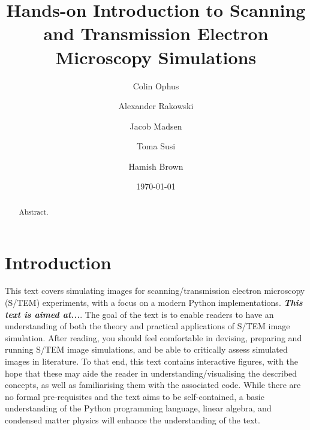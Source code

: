 \documentclass[%
 superscriptaddress,
 aip,
 amsmath,amssymb,
preprint,%
 author-year,%
longbibliography
]{revtex4-2}
\begin{document}
\title[Elements: S/TEM Sim]{Hands-on Introduction to Scanning and Transmission Electron Microscopy Simulations}

\author{Colin Ophus}

\author{Alexander Rakowski}

\author{Jacob Madsen}

\author{Toma Susi}

\author{Hamish Brown}


\date{\today}
\begin{abstract}

Abstract.

\end{abstract}


\maketitle
\tableofcontents

\section*{Introduction}


This text covers simulating images for scanning/transmission electron microscopy (S/TEM) experiments, with a focus on a modern Python implementations. \textbf{\emph{This text is aimed at...}}. The goal of the text is to enable readers to have an understanding of both the theory and practical applications of S/TEM image simulation. After reading, you should feel comfortable in devising, preparing and running S/TEM image simulations, and be able to critically assess simulated images in literature. To that end, this text contains interactive figures, with the hope that these may aide the reader in understanding/visualising the described concepts, as well as familiarising them with the associated code. While there are no formal pre-requisites and the text aims to be self-contained, a basic understanding of the Python programming language, linear algebra, and condensed matter physics will enhance the understanding of the text. %
\end{document}
